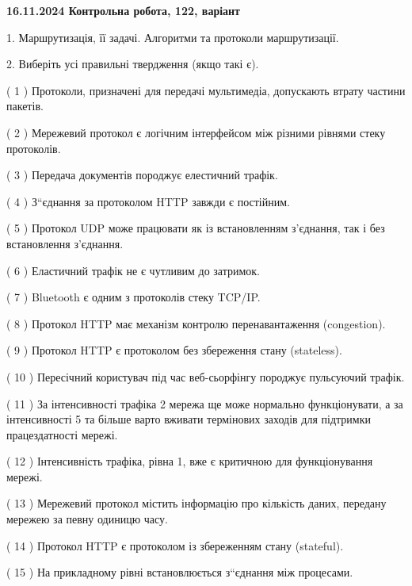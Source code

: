 \documentclass[12pt, ukrainian]{article}
\begin{document}
\begin {large}

\textbf{16.11.2024 Контрольна робота, 122, варіант  }\par


{
1. Маршрутизація, її задачі. Алгоритми та протоколи маршрутизації.



\vspace{5mm}
2. Виберіть усі правильні твердження (якщо такі є).\par
\vspace{2mm}

( 1 ) Протоколи, призначені для передачі мультимедіа, допускають втрату частини пакетів.

( 2 ) Мережевий протокол є логічним інтерфейсом між різними рівнями стеку протоколів.

( 3 ) Передача документів породжує елестичний трафік.

( 4 ) З“єднання за протоколом  HTTP завжди є постійним.

( 5 ) Протокол UDP може працювати як із встановленням з'єднання, так і без встановлення з'єднання.

( 6 ) Еластичний трафік не є чутливим до затримок.

( 7 ) Bluetooth є одним з протоколів стеку TCP/IP.

( 8 ) Протокол HTTP має механізм контролю перенавантаження (congestion).

( 9 ) Протокол  HTTP є протоколом без збереження стану (stateless).

( 10 ) Пересічний користувач під час веб-сьорфінгу породжує пульсуючий трафік.

( 11 ) За інтенсивності трафіка 2 мережа ще може нормально функціонувати, а за інтенсивності 5 та більше варто вживати термінових заходів для підтримки працездатності мережі.

( 12 ) Інтенсивність трафіка, рівна 1, вже є критичною для функціонування мережі.

( 13 ) Мережевий протокол містить інформацію про кількість даних, передану мережею за певну одиницю часу.

( 14 ) Протокол  HTTP є протоколом із збереженням стану (stateful).

( 15 ) На прикладному рівні встановлюється з“єднання між процесами.
}
\end {large}
\end{document}
